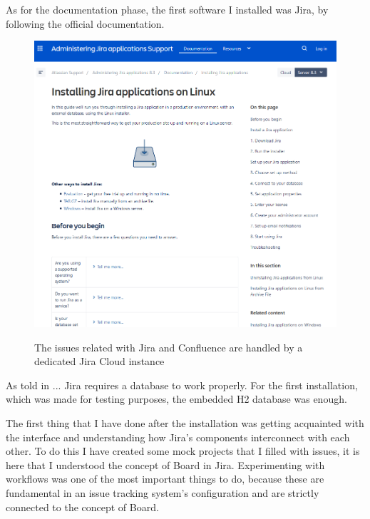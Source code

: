 	As for the documentation phase, the first software I installed was Jira, by following the official documentation.
	\begin{figure}[H]
		\centering
		\includegraphics[width=1\textwidth]{resources/jira_installation}\\
		\caption{The issues related with Jira and Confluence are handled by a dedicated Jira Cloud instance}
	\end{figure}
	
	As told in ... Jira requires a database to work properly.
	For the first installation, which was made for testing purposes, the embedded H2 database was enough.
	
	
	The first thing that I have done after the installation was getting acquainted with the interface and understanding how Jira's components interconnect with each other.
	To do this I have created some mock projects that I filled with issues, it is here that I understood the concept of Board in Jira.
	Experimenting with workflows was one of the most important things to do, because these are fundamental in an issue tracking system's configuration and are strictly connected to the concept of Board.
	
